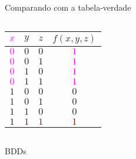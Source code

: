 \expandafter\documentclass\expandafter[table, usenames, svgnames, dvipsnames,14pt, \classopts]{beamer}
\begin{document}
\begin{frame}{Comparando com a tabela-verdade}
\begin{columns}[c]
            \begin{center}
                \small
                \begin{table}
                    \begin{tabular}{ccc|c}
                        \textcolor{magenta}{$x$} & $y$ & $z$ & $f(x,y,z)$\\
                        \hline
                        \textcolor{magenta}{$0$} & $0$ & $0$ & \textcolor{magenta}{$1$}\\
                        \textcolor{magenta}{$0$} & $0$ & $1$ & \textcolor{magenta}{$1$}\\
                        \textcolor{magenta}{$0$} & $1$ & $0$ & \textcolor{magenta}{$1$}\\
                        \textcolor{magenta}{$0$} & $1$ & $1$ & \textcolor{magenta}{$1$}\\
                        $1$ & $0$ & $0$ & $0$\\
                        $1$ & $0$ & $1$ & $0$\\
                        $1$ & $1$ & $0$ & $0$\\
                        $1$ & \textcolor{Maroon}{$1$} & \textcolor{Maroon}{$1$} & \textcolor{Maroon}{$1$}\\
                    \end{tabular}
                \end{table}
            \end{center}
    
    \end{columns}
    
\end{frame}

\begin{frame}{\uppercase{BDD}s}

    \begin{center}
    \end{center}

\end{frame}
\end{document}
